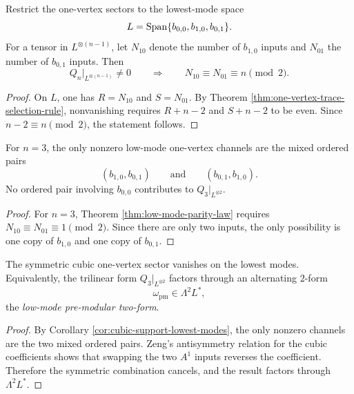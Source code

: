 \begin{theorem}
\label{thm:low-mode-parity-law}
Restrict the one-vertex sectors to the lowest-mode space
\[
L=\operatorname{Span}\{b_{0,0},b_{1,0},b_{0,1}\}.
\]
For a tensor in $L^{\otimes(n-1)}$, let $N_{10}$ denote the number of $b_{1,0}$ inputs and
$N_{01}$ the number of $b_{0,1}$ inputs. Then
\[
Q_n\big|_{L^{\otimes(n-1)}}\neq 0
\qquad\Longrightarrow\qquad
N_{10}\equiv N_{01}\equiv n\pmod 2.
\]
\end{theorem}

\begin{proof}
On $L$, one has $R=N_{10}$ and $S=N_{01}$. By Theorem
\ref{thm:one-vertex-trace-selection-rule}, nonvanishing requires
$R+n-2$ and $S+n-2$ to be even. Since $n-2\equiv n\pmod 2$, the statement follows.
\end{proof}

\begin{corollary}
\label{cor:cubic-support-lowest-modes}
For $n=3$, the only nonzero low-mode one-vertex channels are the mixed ordered pairs
\[
(b_{1,0},b_{0,1})
\qquad\text{and}\qquad
(b_{0,1},b_{1,0}).
\]
No ordered pair involving $b_{0,0}$ contributes to $Q_3|_{L^{\otimes 2}}$.
\end{corollary}

\begin{proof}
For $n=3$, Theorem \ref{thm:low-mode-parity-law} requires
$N_{10}\equiv N_{01}\equiv 1\pmod 2$. Since there are only two inputs, the only possibility is
one copy of $b_{1,0}$ and one copy of $b_{0,1}$.
\end{proof}

\begin{proposition}
\label{prop:vanishing-symmetric-cubic-one-vertex-sector}
The symmetric cubic one-vertex sector vanishes on the lowest modes. Equivalently, the
trilinear form $Q_3|_{L^{\otimes 2}}$ factors through an alternating $2$-form
\[
\omega_{\mathrm{pm}}\in \Lambda^2 L^*,
\]
the \emph{low-mode pre-modular two-form}.
\end{proposition}

\begin{proof}
By Corollary \ref{cor:cubic-support-lowest-modes}, the only nonzero channels are the two mixed
ordered pairs. Zeng's antisymmetry relation for the cubic coefficients shows that swapping the
two $A^1$ inputs reverses the coefficient. Therefore the symmetric combination cancels, and the
result factors through $\Lambda^2L^*$.
\end{proof}

